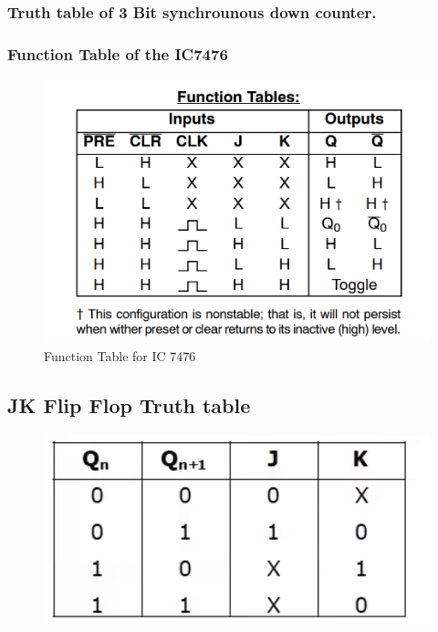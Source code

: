 \documentclass[11pt]{article}
\begin{document}
\subsubsection{Truth table of 3 Bit synchrounous down counter. }

\subsubsection{Function Table of the IC7476}
\begin{figure}[H]
	\centering
	\includegraphics[scale = 0.5]{7476 function table.png}
	\caption{Function Table for IC 7476}
\end{figure}

\subsection{JK Flip Flop Truth table}
\begin{figure}[H]
	\centering
	\includegraphics[scale = 0.4]{jk flip flop truth table.png}
\end{figure}
\end{document}
